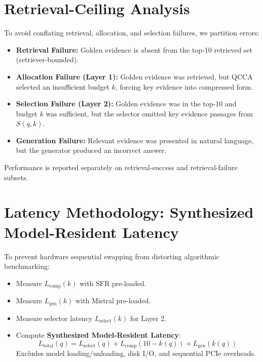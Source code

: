 \documentclass[11pt,a4paper]{article}
\begin{document}
\section{Retrieval-Ceiling Analysis}
To avoid conflating retrieval, allocation, and selection failures, we partition errors:
\begin{itemize}
    \item \textbf{Retrieval Failure:} Golden evidence is absent from the top-10 retrieved set (retriever-bounded).
    \item \textbf{Allocation Failure (Layer 1):} Golden evidence was retrieved, but QCCA selected an insufficient budget $k$, forcing key evidence into compressed form.
    \item \textbf{Selection Failure (Layer 2):} Golden evidence was in the top-10 and budget $k$ was sufficient, but the selector omitted key evidence passages from $S(q, k)$.
    \item \textbf{Generation Failure:} Relevant evidence was presented in natural language, but the generator produced an incorrect answer.
\end{itemize}
Performance is reported separately on retrieval-success and retrieval-failure subsets.

\section{Latency Methodology: Synthesized Model-Resident Latency}
To prevent hardware sequential swapping from distorting algorithmic benchmarking:
\begin{itemize}
    \item Measure $L_{\text{comp}}(k)$ with SFR pre-loaded.
    \item Measure $L_{\text{gen}}(k)$ with Mistral pre-loaded.
    \item Measure selector latency $L_{\text{select}}(k)$ for Layer 2.
    \item Compute \textbf{Synthesized Model-Resident Latency}:
    \begin{equation}
    L_{\text{total}}(q) = L_{\text{select}}(q) + L_{\text{comp}}(10 - k(q)) + L_{\text{gen}}(k(q))
    \end{equation}
    Excludes model loading/unloading, disk I/O, and sequential PCIe overheads.
\end{itemize}
\end{document}
